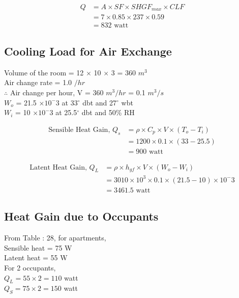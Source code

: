 \documentclass{article}
\begin{document}
    \begin{align*}
      Q &= A \times SF \times SHGF_{max} \times CLF \\
      &= 7 \times 0.85 \times 237 \times 0.59 \\
      &= 832 \text{ watt}
    \end{align*}

    \subsection{Cooling Load for Air Exchange}
    \begin{multicols}{2}
      
      Volume of the room = 12 $\times$ 10 $\times$ 3 = 360 $m^3$ \\
      Air change rate = 1.0 $/hr$ \\
      $\therefore$ Air change per hour, V = 360 $m^3/hr$ = 0.1 $m^3/s$ \\
      
      $W_o$ = 21.5 $\times 10^-3$ at 33$^\circ$ dbt and 27$^{\circ}$ wbt \\ 
      $W_i$ = 10 $\times 10^-3$ at 25.5$^\circ$ dbt and 50\% RH \\ 
    \end{multicols}

    \begin{align*}
      \text{Sensible Heat Gain, } Q_s &= \rho \times C_p \times V \times (T_o - T_i) \\
      &= 1200 \times 0.1 \times (33 - 25.5) \\
      &= 900 \text{ watt}
    \end{align*}
    
    \begin{align*}
      \text{Latent Heat Gain, } Q_L &= \rho \times h_{gf} \times V \times (W_o - W_i) \\
      &= 3010 \times 10^3 \times 0.1 \times (21.5 - 10) \times 10^-3 \\
      &= 3461.5 \text{ watt}
    \end{align*}
    
    \subsection{Heat Gain due to Occupants}
    From Table : 28, for apartments, \\
    Sensible heat = 75 W \\
    Latent heat = 55 W \\
    For 2 occupants,\\
    $Q_L = 55 \times 2 = 110 $ watt \\
    $Q_S = 75 \times 2 = 150 $ watt \\
\end{document}
